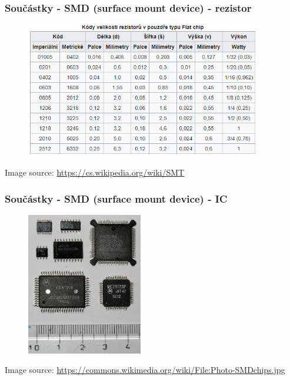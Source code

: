 \documentclass[12;pt,t]{beamer} %
\newcommand{\srctext}[1]{{\fontsize{7}{9}\selectfont\textcolor{sourcesclr}{#1}}}
\begin{document}
\begin{frame}
\frametitle{Součástky - SMD (surface mount device) - rezistor}    	
\begin{figure}[H]
\includegraphics[width=0.92\textwidth]{img/Velikosti_SMD_soucastek.PNG}
\end{figure}
\srctext{Image source: \url{https://cs.wikipedia.org/wiki/SMT}}
\end{frame}

\begin{frame}
    \frametitle{Součástky - SMD (surface mount device) - IC}    	
        \begin{figure}[H]
            \includegraphics[width=0.45\textwidth]{img/Photo-SMDchips.jpg}
       	\end{figure}
    \srctext{Image source: \url{https://commons.wikimedia.org/wiki/File:Photo-SMDchips.jpg}}
\end{frame}
\end{document}
